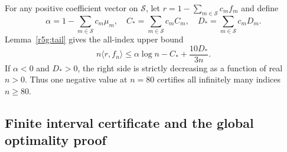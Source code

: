 \documentclass[11pt,a4paper]{article}
\theoremstyle{definition}\newtheorem{definition}[theorem]{Definition}
\theoremstyle{remark}\newtheorem{remark}[theorem]{Remark}
\numberwithin{equation}{section}
\begin{document}
For any positive coefficient vector on $\mathcal S$, let
$r=1-\sum_{m\in\mathcal S}c_mf_m$ and define
\begin{equation}\label{r5g:abc}
 \alpha=1-\sum_{m\in\mathcal S}c_m\mu_m,
 \quad C_* =\sum_{m\in\mathcal S}c_mC_m,
 \quad D_* =\sum_{m\in\mathcal S}c_mD_m.
\end{equation}
Lemma~\ref{r5g:tail} gives the all-index upper bound
\begin{equation}\label{r5g:dual-tail}
 n\langle r,f_n\rangle
 \le\alpha\log n-C_*+\frac{10D_*}{3n}.
\end{equation}
If $\alpha<0$ and $D_*>0$, the right side is strictly decreasing
as a function of real $n>0$. Thus one negative value at $n=80$
certifies all infinitely many indices $n\ge80$.

\subsection{Finite interval certificate and the global optimality proof}
\end{document}
